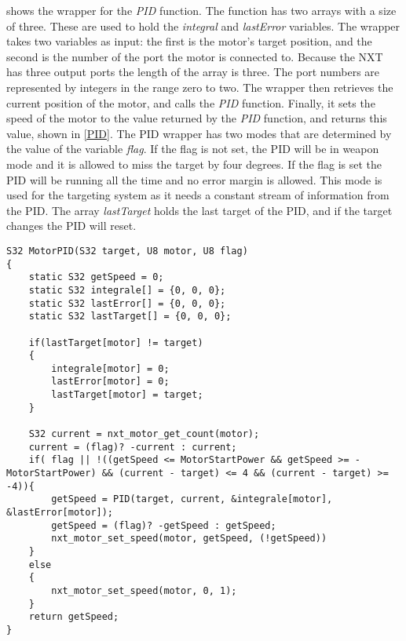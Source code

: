  shows the wrapper for the \emph{PID} function. The function has two arrays with a size of three. These are used to hold the \emph{integral} and \emph{lastError} variables. The wrapper takes two variables as input: the first is the motor's target position, and the second is the number of the port the motor is connected to. Because the NXT has three output ports the length of the array is three. The port numbers are represented by integers in the range zero to two. The wrapper then retrieves the current position of the motor, and calls the \emph{PID} function. Finally, it sets the speed of the motor to the value returned by the \emph{PID} function, and returns this value, shown in \cref{PID}. The PID wrapper has two modes that are determined by the value of the variable \emph{flag}. If the flag is not set, the PID will be in weapon mode and it is allowed to miss the target by four degrees. If the flag is set the PID will be running all the time and no error margin is allowed. This mode is used for the targeting system as it needs a constant stream of information from the PID. The array \emph{lastTarget} holds the last target of the PID, and if the target changes the PID will reset.


\begin{lstlisting}[style=customc, label={PIDwrapper}, caption={PID wrapper}]
S32 MotorPID(S32 target, U8 motor, U8 flag)
{
    static S32 getSpeed = 0;
    static S32 integrale[] = {0, 0, 0};
    static S32 lastError[] = {0, 0, 0};
    static S32 lastTarget[] = {0, 0, 0};

    if(lastTarget[motor] != target)
    {
        integrale[motor] = 0;
        lastError[motor] = 0;
        lastTarget[motor] = target;
    }

    S32 current = nxt_motor_get_count(motor);
    current = (flag)? -current : current;
    if( flag || !((getSpeed <= MotorStartPower && getSpeed >= -MotorStartPower) && (current - target) <= 4 && (current - target) >= -4)){
        getSpeed = PID(target, current, &integrale[motor], &lastError[motor]);
        getSpeed = (flag)? -getSpeed : getSpeed;
        nxt_motor_set_speed(motor, getSpeed, (!getSpeed))
    }
    else 
    {
        nxt_motor_set_speed(motor, 0, 1);
    }
    return getSpeed;
}
\end{lstlisting}


